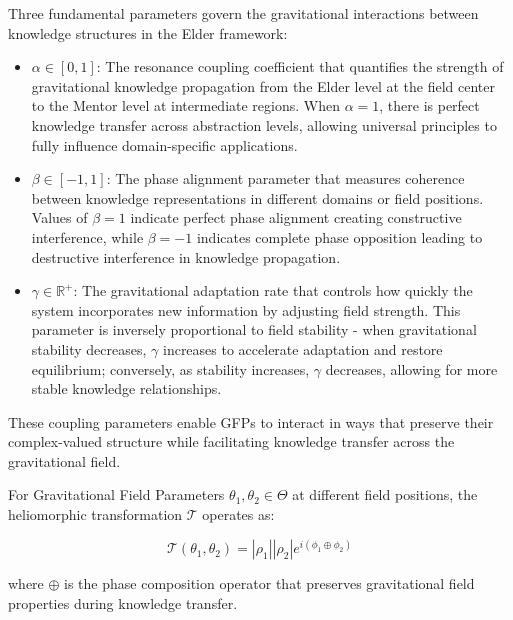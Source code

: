 \begin{definition}
Three fundamental parameters govern the gravitational interactions between knowledge structures in the Elder framework:

\begin{itemize}
    \item $\alpha \in [0,1]$: The resonance coupling coefficient that quantifies the strength of gravitational knowledge propagation from the Elder level at the field center to the Mentor level at intermediate regions. When $\alpha = 1$, there is perfect knowledge transfer across abstraction levels, allowing universal principles to fully influence domain-specific applications.
    
    \item $\beta \in [-1,1]$: The phase alignment parameter that measures coherence between knowledge representations in different domains or field positions. Values of $\beta = 1$ indicate perfect phase alignment creating constructive interference, while $\beta = -1$ indicates complete phase opposition leading to destructive interference in knowledge propagation.
    
    \item $\gamma \in \mathbb{R}^+$: The gravitational adaptation rate that controls how quickly the system incorporates new information by adjusting field strength. This parameter is inversely proportional to field stability - when gravitational stability decreases, $\gamma$ increases to accelerate adaptation and restore equilibrium; conversely, as stability increases, $\gamma$ decreases, allowing for more stable knowledge relationships.
\end{itemize}
\end{definition}

These coupling parameters enable GFPs to interact in ways that preserve their complex-valued structure while facilitating knowledge transfer across the gravitational field.

\begin{theorem}
For Gravitational Field Parameters $\theta_1, \theta_2 \in \Theta$ at different field positions, the heliomorphic transformation $\mathcal{T}$ operates as:

\begin{equation}
\mathcal{T}(\theta_1, \theta_2) = |\rho_1||\rho_2|e^{i(\phi_1 \oplus \phi_2)}
\end{equation}

where $\oplus$ is the phase composition operator that preserves gravitational field properties during knowledge transfer.
\end{theorem}

